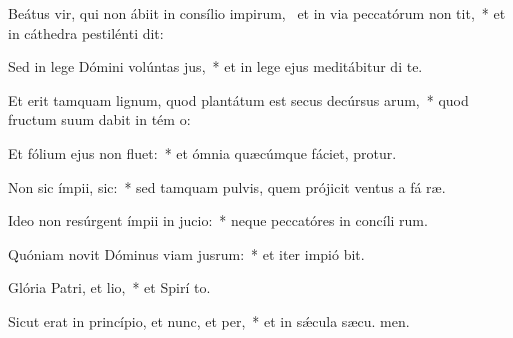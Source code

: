 \item Beátus vir, qui non ábiit in consílio impirum,~\pscross{} et in via peccatórum non tit,~* et in cáthedra pestilénti  dit:
\item Sed in lege Dómini volúntas jus,~* et in lege ejus meditábitur di  te.
\item Et erit tamquam lignum, quod plantátum est secus decúrsus arum,~* quod fructum suum dabit in tém o:
\item Et fólium ejus non fluet:~* et ómnia quæcúmque fáciet, protur.
\item Non sic ímpii,  sic:~* sed tamquam pulvis, quem prójicit ventus a fá ræ.
\item Ideo non resúrgent ímpii in jucio:~* neque peccatóres in concíli rum.
\item Quóniam novit Dóminus viam jusrum:~* et iter impió bit.
\item Glória Patri, et lio,~* et Spirí to.
\item Sicut erat in princípio, et nunc, et per,~* et in sǽcula sæcu. men.
